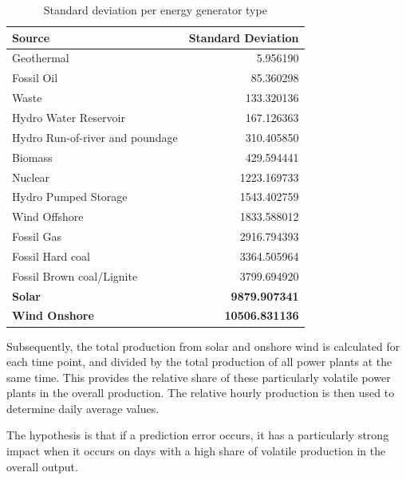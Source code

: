 \begin{table}[ht]
	\centering
	\begin{tabular}{|l|r|}
		\hline
		\textbf{Source}                 & \textbf{Standard Deviation} \\
		\hline
		Geothermal                      & 5.956190                    \\
		Fossil Oil                      & 85.360298                   \\
		Waste                           & 133.320136                  \\
		Hydro Water Reservoir           & 167.126363                  \\
		Hydro Run-of-river and poundage & 310.405850                  \\
		Biomass                         & 429.594441                  \\
		Nuclear                         & 1223.169733                 \\
		Hydro Pumped Storage            & 1543.402759                 \\
		Wind Offshore                   & 1833.588012                 \\
		Fossil Gas                      & 2916.794393                 \\
		Fossil Hard coal                & 3364.505964                 \\
		Fossil Brown coal/Lignite       & 3799.694920                 \\
		\textbf{Solar}                  & \textbf{9879.907341}        \\
		\textbf{Wind Onshore}           & \textbf{10506.831136}       \\
		\hline
	\end{tabular}
	\caption{Standard deviation per energy generator type}
	\label{tab:energy_sources_std}
\end{table}

Subsequently, the total production from solar and onshore wind is calculated for each time point,
and divided by the total production of all power plants at the same time.
This provides the relative share of these particularly volatile power plants in the overall production.
The relative hourly production is then used to determine daily average values.

The hypothesis is that if a prediction error occurs, it has a particularly strong impact when it occurs on days
with a high share of volatile production in the overall output.

